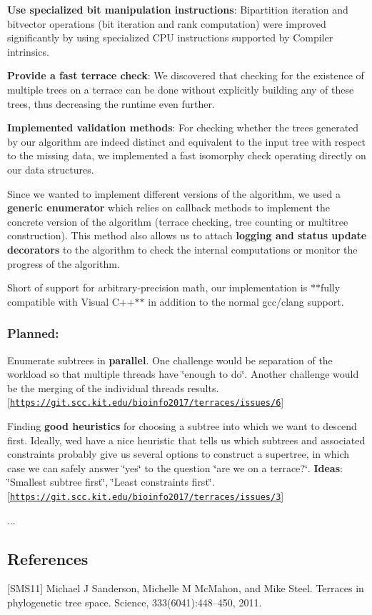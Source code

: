 \begin{DoxyItemize}
\item {\bfseries Use specialized bit manipulation instructions}\+: Bipartition iteration and bitvector operations (bit iteration and rank computation) were improved significantly by using specialized C\+PU instructions supported by Compiler intrinsics.
\item {\bfseries Provide a fast terrace check}\+: We discovered that checking for the existence of multiple trees on a terrace can be done without explicitly building any of these trees, thus decreasing the runtime even further.
\item {\bfseries Implemented validation methods}\+: For checking whether the trees generated by our algorithm are indeed distinct and equivalent to the input tree with respect to the missing data, we implemented a fast isomorphy check operating directly on our data structures.
\item Since we wanted to implement different versions of the algorithm, we used a {\bfseries generic enumerator} which relies on callback methods to implement the concrete version of the algorithm (terrace checking, tree counting or multitree construction). This method also allows us to attach {\bfseries logging and status update decorators} to the algorithm to check the internal computations or monitor the progress of the algorithm.
\item Short of support for arbitrary-\/precision math, our implementation is $\ast$$\ast$fully compatible with Visual C++$\ast$$\ast$ in addition to the normal gcc/clang support.
\end{DoxyItemize}

\subsubsection*{Planned\+:}


\begin{DoxyItemize}
\item Enumerate subtrees in {\bfseries parallel}. One challenge would be separation of the workload so that multiple threads have \char`\"{}enough to do\char`\"{}. Another challenge would be the merging of the individual threads\textquotesingle{} results. \mbox{[}\href{https://git.scc.kit.edu/bioinfo2017/terraces/issues/6}{\tt https\+://git.\+scc.\+kit.\+edu/bioinfo2017/terraces/issues/6}\mbox{]}
\item Finding {\bfseries good heuristics} for choosing a subtree into which we want to descend first. Ideally, we\textquotesingle{}d have a nice heuristic that tells us which subtrees and associated constraints probably give us several options to construct a supertree, in which case we can safely answer \char`\"{}yes\char`\"{} to the question \char`\"{}are we on a terrace?\char`\"{}. {\bfseries Ideas}\+: \char`\"{}\+Smallest subtree first\char`\"{}, \char`\"{}\+Least constraints first\char`\"{}. \mbox{[}\href{https://git.scc.kit.edu/bioinfo2017/terraces/issues/3}{\tt https\+://git.\+scc.\+kit.\+edu/bioinfo2017/terraces/issues/3}\mbox{]}
\item ...
\end{DoxyItemize}

\subsection*{References}

\mbox{[}S\+M\+S11\mbox{]} Michael J Sanderson, Michelle M Mc\+Mahon, and Mike Steel. Terraces in phylogenetic tree space. Science, 333(6041)\+:448–450, 2011. 